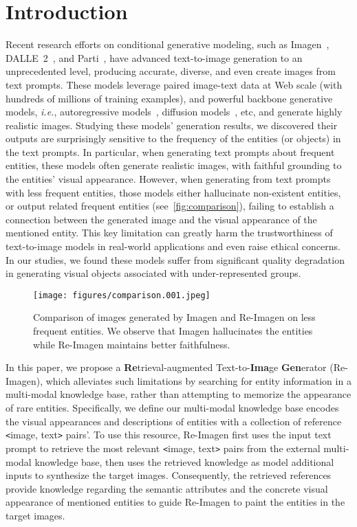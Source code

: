 \documentclass{article} \usepackage{iclr2023_conference,times}
\newcommand{\ie}{\textit{i.e.}}
\newcommand{\modelname}{{Re-Imagen}\xspace}
\begin{document}
\section{Introduction}
Recent research efforts on conditional generative modeling, such as Imagen~\citep{saharia2022photorealistic}, DALLE~2~\citep{ramesh2022hierarchical}, and Parti~\citep{yu2022scaling}, have advanced text-to-image generation to an unprecedented level, producing accurate, diverse, and even create images from text prompts. These models leverage paired image-text data at Web scale (with hundreds of millions of training examples), and powerful backbone generative models, \ie, autoregressive models~\citep{van2017neural,ramesh2021zero,yu2022scaling}, diffusion models~\citep{ho2020denoising,dhariwal2021diffusion}, etc, and generate highly realistic images. Studying these models' generation results, we discovered their outputs are surprisingly sensitive to the frequency of the entities (or objects) in the text prompts. In particular, when generating text prompts about frequent entities, these models often generate realistic images, with faithful grounding to the entities' visual appearance. However, when generating from text prompts with less frequent entities, those models either hallucinate non-existent entities, or output related frequent entities (see~\autoref{fig:comparison}), failing to establish a connection between the generated image and the visual appearance of the mentioned entity. This key limitation can greatly harm the trustworthiness of text-to-image models in real-world applications and even raise ethical concerns. In our studies, we found these models suffer from significant quality degradation in generating visual objects associated with under-represented groups.

\begin{figure}[!thb]
    \centering
    \texttt{[image: figures/comparison.001.jpeg]}
    \caption{{Comparison of images generated by Imagen and \modelname on less frequent entities}. We observe that Imagen hallucinates the entities while \modelname maintains better faithfulness.}
    \label{fig:comparison}
    \vspace{-2ex}
\end{figure}
In this paper, we propose a \textbf{Re}trieval-augmented Text-to-\textbf{Ima}ge \textbf{Gen}erator (\modelname), which alleviates such limitations by searching for entity information in a multi-modal knowledge base, rather than attempting to memorize the appearance of rare entities. Specifically, we define our multi-modal knowledge base encodes the visual appearances and descriptions of entities with a collection of reference \texttt{<}image, text\texttt{>} pairs'. To use this resource, \modelname first uses the input text prompt to retrieve the most relevant \texttt{<}image, text\texttt{>} pairs from the external multi-modal knowledge base, then uses the retrieved knowledge as model additional inputs to synthesize the target images. Consequently, the retrieved references provide knowledge regarding the semantic attributes and the concrete visual appearance of mentioned entities to guide \modelname to paint the entities in the target images. 
\end{document}
